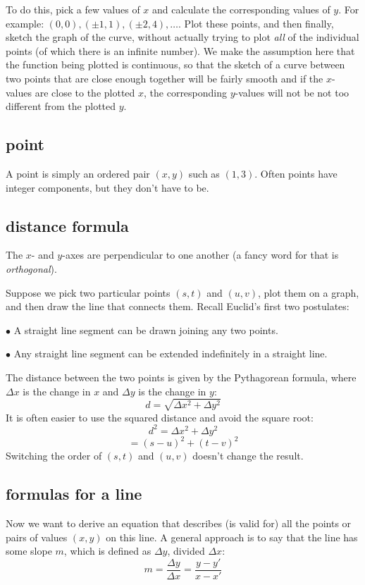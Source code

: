 \documentclass[11pt, oneside]{article}
\begin{document}
To do this, pick a few values of $x$ and calculate the corresponding values of $y$.  For example:  $(0,0), (\pm 1,1), (\pm 2, 4), \dots$.  Plot these points, and then finally, sketch the graph of the curve, without actually trying to plot \emph{all} of the individual points (of which there is an infinite number).  We make the assumption here that the function being plotted is continuous, so that the sketch of a curve between two points that are close enough together will be fairly smooth and if the $x$-values are close to the plotted $x$, the corresponding $y$-values will not be not too different from the plotted $y$.

\subsection*{point}
A point is simply an ordered pair $(x,y)$ such as $(1,3)$.  Often points have integer components, but they don't have to be.

\subsection*{distance formula}
The $x$- and $y$-axes are perpendicular to one another (a fancy word for that is \emph{orthogonal}).  

Suppose we pick two particular points $(s,t)$ and $(u,v)$, plot them on a graph, and then draw the line that connects them.  Recall Euclid's first two postulates:

$\bullet$  A straight line segment can be drawn joining any two points.

$\bullet$   Any straight line segment can be extended indefinitely in a straight line.

The distance between the two points is given by the Pythagorean formula, where $\Delta x$ is the change in $x$ and $\Delta y$ is the change in $y$:
\[ d = \sqrt{\Delta x^2 + \Delta y^2} \]
It is often easier to use the squared distance and avoid the square root:
\[ d^2 = \Delta x^2 + \Delta y^2 \]
\[ = (s-u)^2 + (t-v)^2 \]
Switching the order of $(s,t)$ and $(u,v)$ doesn't change the result.

\subsection*{formulas for a line}
 
Now we want to derive an equation that describes (is valid for) all the points or pairs of values $(x,y)$ on this line.  A general approach is to say that the line has some slope $m$, which is defined as $\Delta y$, divided $\Delta x$:
\[ m = \frac{\Delta y}{\Delta x} = \frac{y-y'}{x-x'} \]
\end{document}
